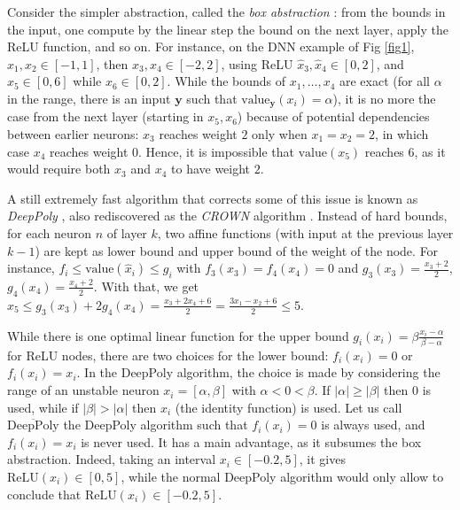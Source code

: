 \documentclass{llncs}
\newcommand{\vy}{\boldsymbol{y}}
\newcommand{\val}{{\textrm{value}}}
\newcommand{\Val}{{\textrm{value}}}
\newcommand{\ReLU}{\mathrm{ReLU}}
\begin{document}
Consider the simpler abstraction, called the {\em box abstraction} \cite{deeppoly}: from the bounds in the input, one compute by the linear step the bound on the next layer, apply the ReLU function, and so on. For instance, on the DNN example of Fig \ref{fig1}, $x_1,x_2 \in [-1,1]$, then $x_3,x_4 \in [-2,2]$, using ReLU $\hat{x}_3,\hat{x}_4 \in [0,2]$, and $x_5 \in [0,6]$ while $x_6 \in [0,2]$. 
While the bounds of $x_1, \ldots, x_4$ are exact (for all $\alpha$ 
in the range, there is an input $\vy$ such that $\val_{\vy}(x_i)=\alpha$), 
it is no more the case from the next layer (starting in $x_5,x_6$) because of potential 
dependencies between earlier neurons: $x_3$ reaches weight $2$ only when $x_1=x_2=2$,
in which case $x_4$ reaches weight $0$. Hence, it is impossible that $\Val(x_5)$ reaches $6$, as it would require both $x_3$ and $x_4$ to have weight $2$.

A still extremely fast algorithm that corrects some of this issue is known as {\em DeepPoly} \cite{deeppoly}, also rediscovered as the {\em CROWN} algorithm \cite{crown}. Instead of 
hard bounds, for each neuron $n$ of layer $k$, two affine functions (with input at the previous layer $k-1$) are kept as lower bound and upper bound of the weight of the node.
For instance, $f_i \leq \Val(\hat{x}_i) \leq g_i$ with 
$f_{3}(x_3)=f_4(x_4)=0$ and 
$g_3(x_3) = \frac{x_3+2}{2}$,
$g_4(x_4) = \frac{x_4+2}{2}$. 
With that, we get 
$x_5 \leq g_3(x_3) + 2 g_4(x_4) = \frac{x_3 + 2x_4 + 6}{2} = \frac{3x_1 - x_2 + 6}{2}\leq 5$.

While there is one optimal linear function for the upper bound $g_i(x_i)= \beta \frac{x_i-\alpha}{\beta-\alpha}$ for ReLU nodes, there are two choices for the lower bound: $f_i(x_i) = 0$ or $f_i(x_i)=x_i$.
In the DeepPoly algorithm, the choice is made by considering the range of an unstable neuron 
$x_i=[\alpha,\beta]$ with $\alpha < 0 < \beta$. 
If $|\alpha|\geq |\beta|$ then $0$ is used, while if $|\beta|>|\alpha|$ then $x_i$ (the identity function) is used. Let us call $\overline{\mbox{DeepPoly}}$ the DeepPoly algorithm such that 
$f_i(x_i) = 0$ is always used, and $f_i(x_i) = x_i$ is never used. 
It has a main advantage, as it subsumes the box abstraction.
Indeed, taking an interval $x_i \in [-0.2,5]$, it gives $\ReLU(x_i) \in [0,5]$, 
while the normal DeepPoly algorithm would only allow to conclude that $\ReLU(x_i) \in [-0.2,5]$.

\end{document}
